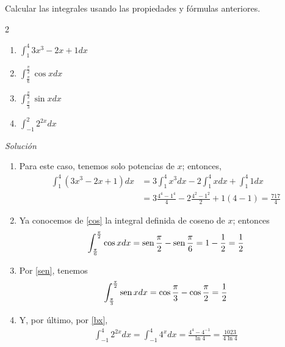\begin{ejemplo}
\textnormal{Calcular las integrales usando las propiedades y fórmulas anteriores.}
\end{ejemplo}
\begin{multicols}{2}
\begin{enumerate}[leftmargin=1.2em,   itemindent=0pt,       labelwidth=\labelwidth,labelsep=0.5em,]

\item $\displaystyle{\int_{1}^{4}3x^{3}-2x+1 dx}$
\item $\displaystyle{\int_{\frac{\pi }{6}}^{\frac{\pi }{2}}\cos xdx}$
\item $\displaystyle{\int_{\frac{\pi }{3}}^{\frac{\pi }{2}}\sin xdx}$
\item $\displaystyle{\int_{-1}^{2}2^{2x}dx}$
\end{enumerate}
\end{multicols}

\textit{Solución}
\begin{enumerate}[leftmargin=1.2em,   itemindent=0pt,       labelwidth=\labelwidth,labelsep=0.5em,]
\item Para este caso, tenemos solo potencias de $x$; entonces,
{\small
\begin{align*}
\int_{1}^{4}\left( 3x^{3}-2x+1\right) dx&=3\int_{1}^{4}x^{3}dx-2\int_{1}^{4}xdx+\int_{1}^{4}1dx\\
&=3\frac{4^{4}-1^{4}}{4}-2\frac{4^{2}-1^{2}}{2}+1\left( 4-1\right) =\frac{717}{4}
\end{align*}
}

\item Ya conocemos de \eqref{cos} la integral definida de coseno de $x$; entonces
{\small
\begin{align*}
\int_{\frac{\pi }{6}}^{\frac{\pi }{2}}\cos xdx=\text{\rm sen}\, \frac{\pi }{2}-\text{\rm sen}\,
\frac{\pi }{6}=1-\frac{1}{2}=\frac{1}{2}
\end{align*}
}

\item Por \eqref{sen}, tenemos
{\small
\begin{align*}
\int_{\frac{\pi }{3}}^{\frac{\pi }{2}}\text{\rm sen}\, xdx=\cos \frac{\pi }{3}-\cos
\frac{\pi }{2}=\frac{1}{2}
\end{align*}
}

\item Y, por último, por \eqref{bx},
{\small
\begin{align*}
\int_{-1}^{4}2^{2x}dx=\int_{-1}^{4}4^{x}dx=\frac{4^{4}-4^{-1}}{\ln 4}=%
\frac{1023}{4\ln 4}
\end{align*}
}
\end{enumerate}


